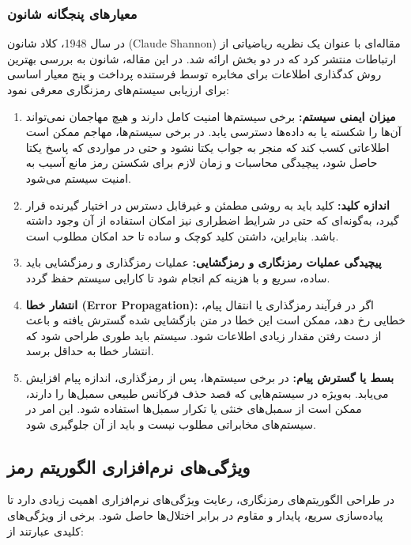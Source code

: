 \documentclass[a4paper,12pt]{report}
\renewcommand{\%}{\lr{\oldpercent}}
\providecommand{\lr}[1]{#1}
\begin{document}
\subsubsection{معیارهای پنجگانه شانون}
در سال 1948، کلاد شانون (\lr{Claude Shannon}) مقاله‌ای با عنوان یک نظریه ریاضیاتی از ارتباطات منتشر کرد که در دو بخش ارائه شد. در این مقاله، شانون به بررسی بهترین روش کدگذاری اطلاعات برای مخابره توسط فرستنده پرداخت و پنج معیار اساسی برای ارزیابی سیستم‌های رمزنگاری معرفی نمود\cite{ref39}:

\begin{enumerate}
    \item \textbf{میزان ایمنی سیستم:} برخی سیستم‌ها امنیت کامل دارند و هیچ مهاجمان نمی‌تواند آن‌ها را شکسته یا به داده‌ها دسترسی یابد. در برخی سیستم‌ها، مهاجم ممکن است اطلاعاتی کسب کند که منجر به جواب یکتا نشود و حتی در مواردی که پاسخ یکتا حاصل شود، پیچیدگی محاسبات و زمان لازم برای شکستن رمز مانع آسیب به امنیت سیستم می‌شود.
    \item \textbf{اندازه کلید:} کلید باید به روشی مطمئن و غیرقابل دسترس در اختیار گیرنده قرار گیرد، به‌گونه‌ای که حتی در شرایط اضطراری نیز امکان استفاده از آن وجود داشته باشد. بنابراین، داشتن کلید کوچک و ساده تا حد امکان مطلوب است.
    \item \textbf{پیچیدگی عملیات رمزنگاری و رمزگشایی:} عملیات رمزگذاری و رمزگشایی باید ساده، سریع و با هزینه کم انجام شود تا کارایی سیستم حفظ گردد.
    \item \textbf{انتشار خطا (\lr{Error Propagation}):} اگر در فرآیند رمزگذاری یا انتقال پیام، خطایی رخ دهد، ممکن است این خطا در متن بازگشایی شده گسترش یافته و باعث از دست رفتن مقدار زیادی اطلاعات شود. سیستم باید طوری طراحی شود که انتشار خطا به حداقل برسد.
    \item \textbf{بسط یا گسترش پیام:} در برخی سیستم‌ها، پس از رمزگذاری، اندازه پیام افزایش می‌یابد. به‌ویژه در سیستم‌هایی که قصد حذف فرکانس طبیعی سمبل‌ها را دارند، ممکن است از سمبل‌های خنثی یا تکرار سمبل‌ها استفاده شود. این امر در سیستم‌های مخابراتی مطلوب نیست و باید از آن جلوگیری شود.
\end{enumerate}

\subsection{ویژگی‌های نرم‌افزاری الگوریتم رمز}
در طراحی الگوریتم‌های رمزنگاری، رعایت ویژگی‌های نرم‌افزاری اهمیت زیادی دارد تا پیاده‌سازی سریع، پایدار و مقاوم در برابر اختلال‌ها حاصل شود. برخی از ویژگی‌های کلیدی عبارتند از\cite{ref41}:
\end{document}
